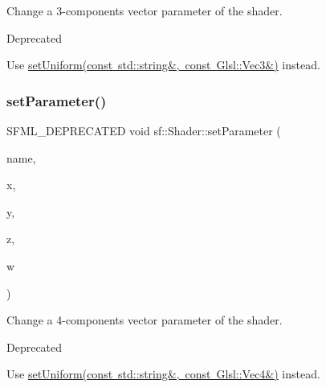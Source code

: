 Change a 3-\/components vector parameter of the shader. 

\begin{DoxyRefDesc}{Deprecated}
\item[\mbox{\hyperlink{deprecated__deprecated000008}{Deprecated}}]Use \mbox{\hyperlink{classsf_1_1_shader_aad654ad8de6f0c56191fa7b8cea21db2}{set\+Uniform(const std\+::string\&, const Glsl\+::\+Vec3\&)}} instead. \end{DoxyRefDesc}
\begin{DoxyVerb}\end{DoxyVerb}
 \mbox{\label{classsf_1_1_shader_a6d6b84575a5f1a869d70a126df8d6478}} 
\subsubsection{\texorpdfstring{setParameter()}{setParameter()}\hspace{0.1cm}{\footnotesize\ttfamily [4/10]}}
{\footnotesize\ttfamily S\+F\+M\+L\+\_\+\+D\+E\+P\+R\+E\+C\+A\+T\+ED void sf\+::\+Shader\+::set\+Parameter (\begin{DoxyParamCaption}\item[{const std\+::string \&}]{name,  }\item[{float}]{x,  }\item[{float}]{y,  }\item[{float}]{z,  }\item[{float}]{w }\end{DoxyParamCaption})}



Change a 4-\/components vector parameter of the shader. 

\begin{DoxyRefDesc}{Deprecated}
\item[\mbox{\hyperlink{deprecated__deprecated000009}{Deprecated}}]Use \mbox{\hyperlink{classsf_1_1_shader_abc1aee8343800680fd62e1f3d43c24bf}{set\+Uniform(const std\+::string\&, const Glsl\+::\+Vec4\&)}} instead. \end{DoxyRefDesc}
\begin{DoxyVerb}\end{DoxyVerb}
 \mbox{\label{classsf_1_1_shader_aee671dda9a84f607b9b780b2796def74}} 
